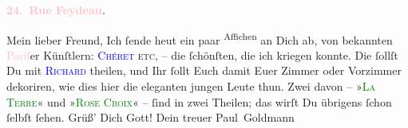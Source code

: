            \pstart
           \begin{otherlanguage}{french}\textcolor{gray}{\textbf{\textbf{\textcolor{pink}{24. Rue Feydeau}{}\ledrightnote{\textcolor{pink}{rue Feydeau}}.}}}\end{otherlanguage}\pend
           \pstart\center{}Mein lieber Freund,\pend\pstart
           Ich ſende heut ein paar \substVorne{}\textsuperscript{Affichen}{\allowbreak}\substDazwischen{}\label{K_L02730-1v}\label{K_L02730-1h}\substHinten{} an Dich ab, von bekannten \textcolor{pink}{Pariſ}{}\ledrightnote{\textcolor{pink}{Paris}}er Künſtlern: \textsc{\textcolor{blue}{Chéret}{}\ledrightnote{\textcolor{blue}{Jules Chéret}}}{ }\textsc{etc}, – die ſchönſten, die ich kriegen konnte. Die ſollſt Du
               mit \textsc{\textcolor{blue}{Richard}{}\ledrightnote{\textcolor{blue}{Richard Beer-Hofmann}}} theilen, und Ihr ſollt Euch damit Euer Zimmer oder Vorzimmer dekoriren, wie
               dies hier die eleganten jungen Leute thun. Zwei davon – »\textsc{\textcolor{green}{La Terre}{}\ledrightnote{\textcolor{green}{La terre par E. Zola}}}« und »\textsc{\textcolor{green}{Rose Croix}{}\ledrightnote{\textcolor{green}{Salon de la Rose Croix}}}« – ſind in zwei Theilen; das wirſt Du übrigens ſchon ſelbſt ſehen. Grüß’ Dich
               Gott! Dein treuer\pend
           \pstart \spacefill\mbox{Paul Goldmann}\pend{}\endnumbering{}  
      